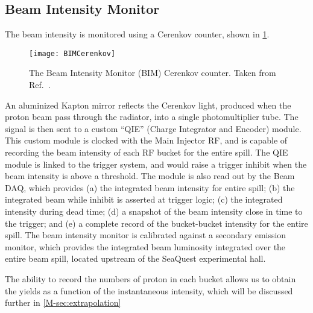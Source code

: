 \documentclass[../main.tex]{subfiles}
\begin{document}
\subsection{Beam Intensity Monitor}
\label{subsec:BIM}
The beam intensity is monitored using a Cerenkov counter, shown in \cref{fig:BIM}.
\begin{figure}[htbp!]
	\centering
	\texttt{[image: BIMCerenkov]}
	\caption{The Beam Intensity Monitor (BIM) Cerenkov counter. Taken from Ref.\
		\cite{aidala2019}.}
	\label{fig:BIM}
\end{figure}
An aluminized Kapton mirror reflects the Cerenkov light, produced when the proton beam
pass through the radiator, into a single photomultiplier tube. The signal is then
sent to a custom ``QIE'' (Charge Integrator and Encoder) module. This custom module
is clocked with the Main Injector RF, and is capable of recording the beam intensity
of each RF bucket for the entire spill. The QIE module is linked to the trigger
system, and would raise a trigger inhibit when the beam intensity is above a
threshold. The module is also read out by the Beam DAQ, which provides (a) the
integrated beam intensity for entire spill; (b) the integrated beam while inhibit is
asserted at trigger logic; (c) the integrated intensity during dead time; (d) a snapshot
of the beam intensity close in time to the trigger; and (e) a complete record of the
bucket-bucket intensity for the entire spill. The beam intensity monitor is calibrated
against a secondary emission monitor, which provides the integrated beam luminosity
integrated over the entire beam spill, located upstream of the SeaQuest experimental hall.

The ability to record the numbers of proton in each bucket allows us to obtain the
yields as a function of the instantaneous intensity, which will be discussed
further in \cref{M-sec:extrapolation}
\end{document}
